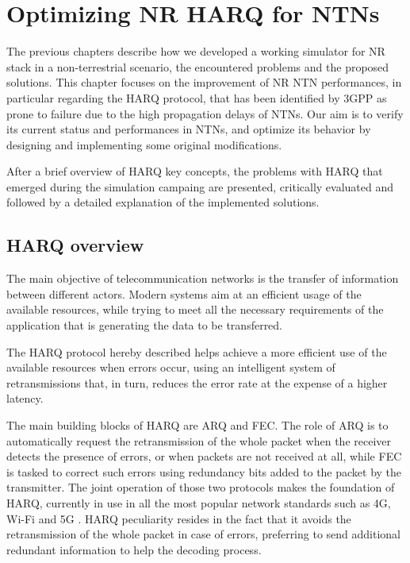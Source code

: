 
\chapter{Optimizing NR HARQ for NTNs}
\label{chp:harq}
The previous chapters describe how we developed a working simulator for \ac{NR} stack in a non-terrestrial scenario, the encountered problems and the proposed solutions. This chapter focuses on the improvement of \ac{NR} \ac{NTN} performances, in particular regarding the \ac{HARQ} protocol, that has been identified by \ac{3GPP} as prone to failure due to the high propagation delays of \ac{NTN}s. Our aim is to verify its current status and performances in \ac{NTN}s, and optimize its behavior by designing and implementing some original modifications.

After a brief overview of \ac{HARQ} key concepts, the problems with \ac{HARQ} that emerged during the simulation campaing are presented, critically evaluated and followed by a detailed explanation of the implemented solutions.

\section{HARQ overview}
The main objective of telecommunication networks is the transfer of information between different actors. Modern systems aim at an efficient usage of the available resources, while trying to meet all the necessary requirements of the application that is generating the data to be transferred. 

The \ac{HARQ} protocol hereby described helps achieve a more efficient use of the available resources when errors occur, using an intelligent system of retransmissions that, in turn, reduces the error rate at the expense of a higher latency.

The main building blocks of \ac{HARQ} are \ac{ARQ} and \ac{FEC}. The role of \ac{ARQ} is to automatically request the retransmission of the whole packet when the receiver detects the presence of errors, or when packets are not received at all, while \ac{FEC} is tasked to correct such errors using redundancy bits added to the packet by the transmitter. The joint operation of those two protocols makes the foundation of \ac{HARQ}, currently in use in all the most popular network standards such as 4G, Wi-Fi and 5G \cite{3gpp-38-series}. \ac{HARQ} peculiarity resides in the fact that it avoids the retransmission of the whole packet in case of errors, preferring to send additional redundant information to help the decoding process.


